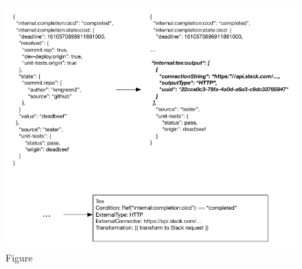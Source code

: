 \documentclass[10pt,twocolumn]{article}
\begin{document}
\begin{figure}
\centering
\includegraphics{figures/tee.pdf}
\caption{Figure}
\label{fig:tee}
\end{figure}
\end{document}
